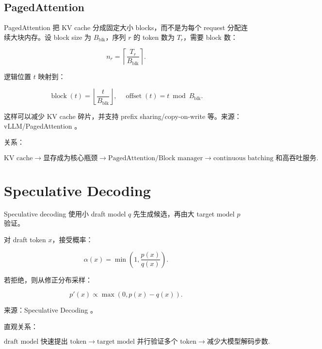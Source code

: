 \documentclass[UTF8,12pt]{ctexart}
\newcommand{\1}{\mathbf{1}}
\begin{document}
\subsection{PagedAttention}

PagedAttention 把 KV cache 分成固定大小 blocks，而不是为每个 request 分配连续大块内存。设 block size 为 $B_{\mathrm{blk}}$，序列 $r$ 的 token 数为 $T_r$，需要 block 数：

\begin{equation}
n_r=\left\lceil\frac{T_r}{B_{\mathrm{blk}}}\right\rceil.
\end{equation}

逻辑位置 $t$ 映射到：

\begin{equation}
\operatorname{block}(t)=\left\lfloor\frac{t}{B_{\mathrm{blk}}}\right\rfloor,
\quad
\operatorname{offset}(t)=t\bmod B_{\mathrm{blk}}.
\end{equation}

这样可以减少 KV cache 碎片，并支持 prefix sharing/copy-on-write 等。来源：vLLM/PagedAttention \cite{kwon2023vllm}。

关系：

\[
\text{KV cache}
\rightarrow
\text{显存成为核心瓶颈}
\rightarrow
\text{PagedAttention/Block manager}
\rightarrow
\text{continuous batching 和高吞吐服务}.
\]

\section{Speculative Decoding}

Speculative decoding 使用小 draft model $q$ 先生成候选，再由大 target model $p$ 验证。

对 draft token $x$，接受概率：

\begin{equation}
\alpha(x)
=\min\left(1,\frac{p(x)}{q(x)}\right).
\label{eq:speculative-accept}
\end{equation}

若拒绝，则从修正分布采样：

\begin{equation}
p'(x)
\propto
\max(0,p(x)-q(x)).
\end{equation}

来源：Speculative Decoding \cite{leviathan2023speculative}。

直观关系：

\[
\text{draft model 快速提出 token}
\rightarrow
\text{target model 并行验证多个 token}
\rightarrow
\text{减少大模型解码步数}.
\]
\end{document}

